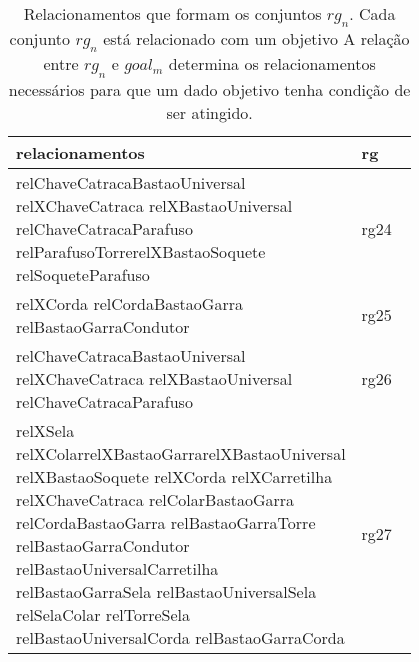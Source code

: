 \begin{table}[H]
\centering
{}
\begin{tabular}{|p{0.8\linewidth}|l|}
\hline
\textbf{relacionamentos}                                                                                                                                                                                                                                                                                                                  & \textbf{rg} \\ \hline
relChaveCatracaBastaoUniversal relXChaveCatraca relXBastaoUniversal relChaveCatracaParafuso relParafusoTorrerelXBastaoSoquete relSoqueteParafuso                                                                                                                                                                                           & rg24        \\ \hline
relXCorda relCordaBastaoGarra relBastaoGarraCondutor                                                                                                                                                                                                                                                                                      & rg25        \\ \hline
relChaveCatracaBastaoUniversal relXChaveCatraca relXBastaoUniversal relChaveCatracaParafuso                                                                                                                                                                                                                                               & rg26        \\ \hline
relXSela relXColarrelXBastaoGarrarelXBastaoUniversal relXBastaoSoquete relXCorda relXCarretilha relXChaveCatraca relColarBastaoGarra relCordaBastaoGarra relBastaoGarraTorre relBastaoGarraCondutor relBastaoUniversalCarretilha relBastaoGarraSela relBastaoUniversalSela relSelaColar relTorreSela relBastaoUniversalCorda relBastaoGarraCorda & rg27  \\ \hline
\end{tabular}
\caption{Relacionamentos que formam os conjuntos $rg_n$. Cada conjunto $rg_n$ está relacionado com um objetivo A relação entre $rg_n$ e $goal_m$ determina os relacionamentos necessários para que um dado objetivo tenha condição de ser atingido.}
\label{relationsgroup2}
\end{table}




